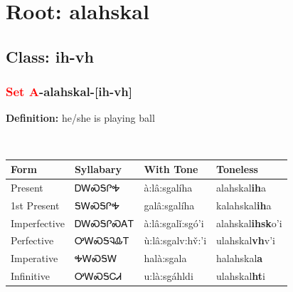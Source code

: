 \needspace{4in}
\section*{Root: alahskal}
\nopagebreak
{}
\needspace{3in}
\subsection*{Class: ih-vh}
\nopagebreak
\needspace{2in}
\subsubsection*{\textcolor{Red}{Set A}{-}\textbf{alahskal}{-}[ih-vh]}
\nopagebreak
\textbf{Definition: } he/she is playing ball
\\[0.5em]
\begin{tabularx}{\textwidth}{l X X X}%
\toprule%
\textbf{Form}&\textbf{Syllabary}&\textbf{With Tone}&\textbf{Toneless}\\%
\midrule%
Present&ᎠᎳᏍᎦᎵᎭ&à:lâ:sgalíha&alahskal\textbf{ih}a\\%
1st Present&ᎦᎳᏍᎦᎵᎭ&galâ:sgalíha&kalahskal\textbf{ih}a\\%
Imperfective&ᎠᎳᏍᎦᎵᏍᎪᎢ&à:lâ:sgalǐ:sgó’i&alahskal\textbf{ihsk}o'i\\%
Perfective&ᎤᎳᏍᎦᎸᎲᎢ&ù:lâ:sgalv:hv̌:’i&ulahskal\textbf{vh}v'i\\%
Imperative&ᎭᎳᏍᎦᎳ&halà:sgala&halahskal\textbf{a}\\%
Infinitive&ᎤᎳᏍᎦᏟᏗ&u:là:sgáhldi&ulahskal\textbf{ht}i\\%
\bottomrule%
\end{tabularx}
\\[1em]